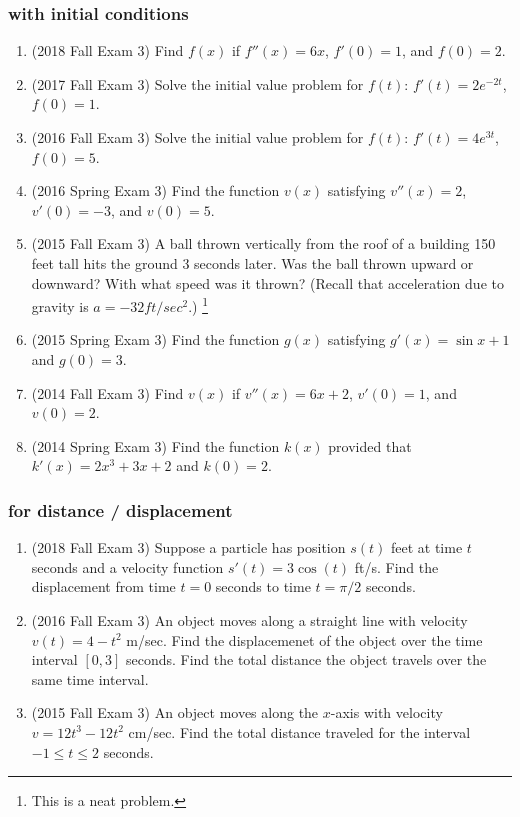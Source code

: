 \documentclass[10pt]{scrartcl}
\begin{document}
\subsubsection{with initial conditions}
\begin{enumerate}
\item (2018 Fall Exam 3) Find $f(x)$ if $f''(x) = 6x$, $f'(0) = 1$, and $f(0) = 2$.
\item (2017 Fall Exam 3) Solve the initial value problem for $f(t)$: $f'(t) = 2e^{-2t}$, $f(0) = 1$. 
\item (2016 Fall Exam 3) Solve the initial value problem for $f(t)$: $f'(t) = 4e^{3t}$, $f(0) = 5$.
\item (2016 Spring Exam 3) Find the function $v(x)$ satisfying $v''(x) = 2$, $v'(0) = -3$, and $v(0) = 5$.
\item (2015 Fall Exam 3) A ball thrown vertically from the roof of a building 150 feet tall hits the ground 3 seconds later. Was the ball thrown upward or downward? With what speed was it thrown? (Recall that acceleration due to gravity is $a = -32 \si{ft/sec^2}$.) \footnote{This is a neat problem.}
\item (2015 Spring Exam 3) Find the function $g(x)$ satisfying $g'(x) = \sin x + 1$ and $g(0) = 3$. 
\item (2014 Fall Exam 3) Find $v(x)$ if $v''(x) = 6x+ 2$, $v'(0) = 1$, and $v(0) = 2$.
\item (2014 Spring Exam 3) Find the function $k(x)$ provided that $k'(x) = 2x^3 + 3x + 2$ and $k(0) = 2$. 
\end{enumerate}

\subsubsection{for distance / displacement} 
\begin{enumerate}
\item (2018 Fall Exam 3) Suppose a particle has position $s(t)$ feet at time $t$ seconds and a velocity function $s'(t) = 3\cos(t)$ ft/s. Find the displacement from time $t = 0$ seconds to time $t = \pi/2$ seconds.
\item (2016 Fall Exam 3) An object moves along a straight line with velocity $v(t) = 4 - t^2$ m/sec. Find the displacemenet of the object over the time interval $[0, 3]$ seconds. Find the total distance the object travels over the same time interval.
\item (2015 Fall Exam 3) An object moves along the $x$-axis with velocity $v = 12t^3 - 12t^2 $ \si{cm/sec}. Find the total distance traveled for the interval $-1 \le t \le 2$ seconds.
\end{enumerate}
\end{document}
